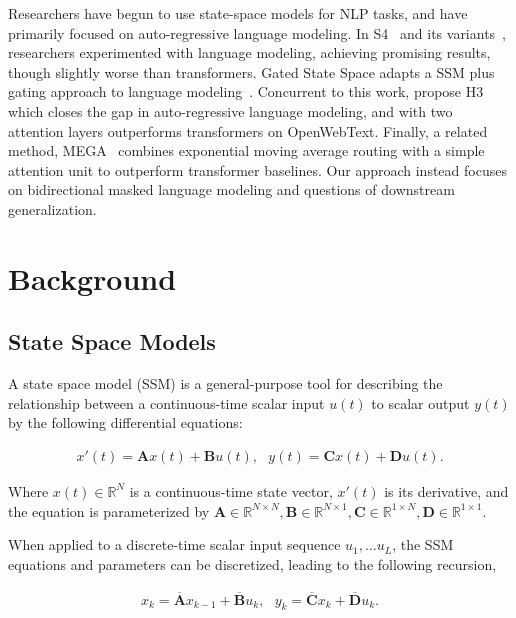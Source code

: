 Researchers have begun to use state-space models for NLP tasks, and have primarily focused on auto-regressive language modeling. In S4~\citep{gu2021efficiently} and its variants~\citep{gupta2022diagonal, gu2022parameterization}, researchers experimented with language modeling, achieving promising results, though slightly worse than transformers. Gated State Space adapts a SSM plus gating approach to language modeling~\cite{mehta2022long}. Concurrent to this work, \citet{dao2022hungry} propose H3 which closes the gap in auto-regressive language modeling, and with two attention layers outperforms transformers on OpenWebText. Finally, a related method, MEGA~\citep{ma2022mega} combines exponential moving average routing with a simple attention unit to outperform transformer baselines. Our approach instead focuses on bidirectional masked language modeling and questions of downstream generalization. 

\section{Background}

\subsection{State Space Models}

A state space model (SSM) is a general-purpose tool for describing the relationship between a continuous-time scalar input $u(t)$ to scalar output $y(t)$ by the following differential equations:

\begin{align*}
    x'(t) = \boldsymbol{A}x(t) + \boldsymbol{B}u(t),\ \ \ 
    y(t) = \boldsymbol{C}x(t) + \boldsymbol{D}u(t).
\end{align*}

 Where $x(t) \in \mathbb{R}^{N}$ is a continuous-time state vector, $x'(t)$ is its derivative, and the equation is parameterized by $\boldsymbol{A} \in \mathbb{R}^{N\times N}, \boldsymbol{B}\in \mathbb{R}^{N \times 1}, \boldsymbol{C} \in \mathbb{R}^{1 \times N}, \boldsymbol{D} \in \mathbb{R}^{1\times 1}$.

When applied to a discrete-time scalar input sequence $u_1, \ldots u_L$, the SSM equations and parameters can be discretized, leading to the following recursion,

\begin{align*}
x_{k} = \boldsymbol{\overline{A}} x_{k-1} + \boldsymbol{\overline{B}} u_k,  \ \ \ 
y_k = \boldsymbol{\overline{C}} x_k + \boldsymbol{\overline{D}}  u_k. 
\end{align*}

